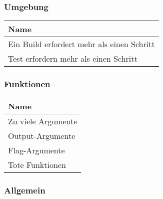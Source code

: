 \subsubsection{Umgebung}

\begin{table}[H]
	\centering
		 \begin{tabular}{ | l | }
		 \hline
			Name \\  \hline
			Ein Build erfordert mehr als einen Schritt \\
			Test erfordern mehr als einen Schritt \\ \hline
		\end{tabular}
	\label{tab:SmellsUndHeuristiken_Umgebung}
\end{table}

\subsubsection{Funktionen}

\begin{table}[H]
	\centering
		 \begin{tabular}{ | l | }
		 \hline
			Name \\  \hline
			Zu viele Argumente \\
			Output-Argumente \\
			Flag-Argumente \\
			Tote Funktionen \\ \hline
		\end{tabular}
	\label{tab:SmellsUndHeuristiken_Functions}
\end{table}

\subsubsection{Allgemein}

